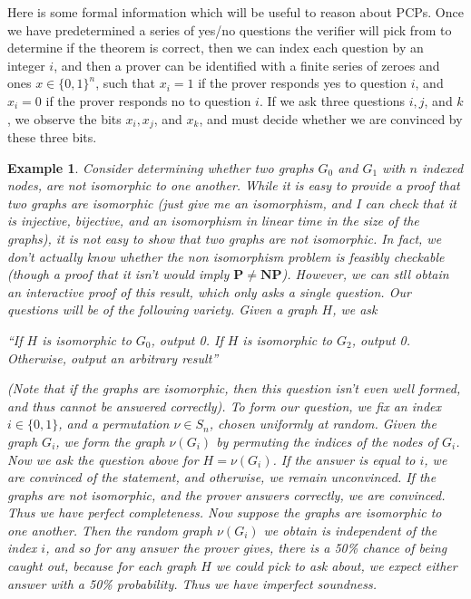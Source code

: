 \documentclass{article}
\theoremstyle{plain}
\newtheorem*{example}{Example}
\theoremstyle{definition}
\begin{document}
Here is some formal information which will be useful to reason about PCPs. Once we have predetermined a series of yes/no questions the verifier will pick from to determine if the theorem is correct, then we can index each question by an integer $i$, and then a prover can be identified with a finite series of zeroes and ones $x \in \{ 0, 1 \}^n$, such that $x_i = 1$ if the prover responds yes to question $i$, and $x_i = 0$ if the prover responds no to question $i$. If we ask three questions $i,j$, and $k$, we observe the bits $x_i, x_j$, and $x_k$, and must decide whether we are convinced by these three bits.

\begin{example}
    Consider determining whether two graphs $G_0$ and $G_1$ with $n$ indexed nodes, are {\it not} isomorphic to one another. While it is easy to provide a proof that two graphs are isomorphic (just give me an isomorphism, and I can check that it is injective, bijective, and an isomorphism in linear time in the size of the graphs), it is {\it not} easy to show that two graphs are not isomorphic. In fact, we don't actually know whether the non isomorphism problem is feasibly checkable (though a proof that it isn't would imply $\mathbf{P} \neq \mathbf{NP}$). However, we can stll obtain an interactive proof of this result, which only asks a single question. Our questions will be of the following variety. Given a graph $H$, we ask
    \begin{center} ``If $H$ is isomorphic to $G_0$, output 0. If $H$ is isomorphic to $G_2$, output 0. Otherwise, output an arbitrary result'' \end{center}
    (Note that if the graphs are isomorphic, then this question isn't even well formed, and thus cannot be answered correctly). To form our question, we fix an index $i \in \{ 0, 1 \}$, and a permutation $\nu \in S_n$, chosen uniformly at random. Given the graph $G_i$, we form the graph $\nu(G_i)$ by permuting the indices of the nodes of $G_i$. Now we ask the question above for $H = \nu(G_i)$. If the answer is equal to $i$, we are convinced of the statement, and otherwise, we remain unconvinced. If the graphs are not isomorphic, and the prover answers correctly, we are convinced. Thus we have perfect completeness. Now suppose the graphs are isomorphic to one another. Then the random graph $\nu(G_i)$ we obtain is independent of the index $i$, and so for any answer the prover gives, there is a 50\% chance of being caught out, because for each graph $H$ we could pick to ask about, we expect either answer with a 50\% probability. Thus we have imperfect soundness.
\end{example}
\end{document}
